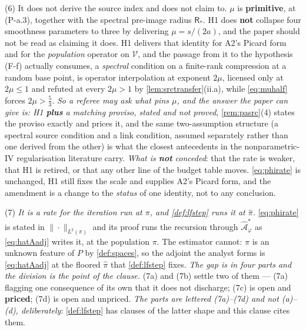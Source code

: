 \begin{remark}
(6) It does not derive the source index and does not claim to. $\mu$ is
\textbf{primitive}, at (P-a.3), together with the spectral pre-image radius $\mathsf R_\ast$. H1
does \textbf{not} collapse four smoothness parameters to three by
delivering $\mu=s/(2a)$, and the paper should not be read as claiming it does.
H1 delivers that identity for A2's Picard form and for the
\emph{population} operator on $\mathcal V$, and the passage from it to the hypothesis (F-f) actually
consumes, a \emph{spectral} condition on a finite-rank compression at a random base point, is
operator interpolation at exponent $2\mu$, licensed only at $2\mu\le1$ and refuted at every $2\mu>1$ by
\cref{lem:srctransfer}(ii.a), while \eqref{eq:muhalf} forces $2\mu>\tfrac53$. \emph{So a referee may ask
what pins $\mu$, and the answer the paper can give is: H1 \textbf{plus} a matching proviso, stated and
not proved}, \cref{rem:pasrc}(4) states the proviso exactly and prices it, and the same two-assumption
structure (a spectral source condition and a link condition, assumed separately rather than one derived
from the other) is what the closest antecedents in the nonparametric-IV regularisation literature carry.
\emph{What is \textbf{not} conceded}: that the rate is weaker, that H1 is retired, or that any other line
of the budget table moves. \eqref{eq:phirate} is unchanged, H1 still fixes the scale and supplies A2's
Picard form, and the amendment is a change to the \emph{status} of one identity, not to any conclusion.

(7) \emph{It is a rate for the iteration run at $\pi$, and \cref{def:lfstep} runs it at $\hat\pi$.}
\eqref{eq:phirate} is stated in $\|\cdot\|_{L^{2}(\pi)}$ and its proof runs the recursion through
$\hat{\mathcal A}^\ast_\varphi$ as \eqref{eq:hatAadj} writes it, at the population $\pi$. The estimator
cannot: $\pi$ is an unknown feature of $P$ by \cref{def:spaces}, so the adjoint the analyst forms is
\eqref{eq:hatAadj} at the floored $\hat\pi$ that \cref{def:lfstep} fixes. \emph{The gap is in four parts
and the division is the point of the clause.} \textup{(7a)} and \textup{(7b)} settle two of them ---
\textup{(7a)} flagging one consequence of its own that it does not discharge; \textup{(7c)} is open and
\textbf{priced}; \textup{(7d)} is open and unpriced. \emph{The parts are lettered
\textup{(7a)}--\textup{(7d)} and not \textup{(a)}--\textup{(d)}, deliberately}: \cref{def:lfstep} has
clauses of the latter shape and this clause cites them.


\end{remark}
